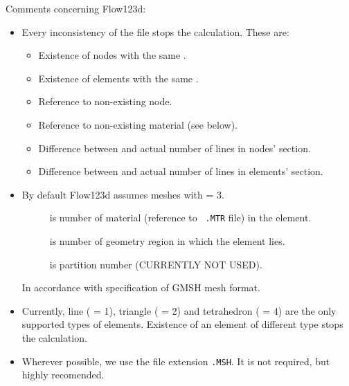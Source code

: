 Comments concerning Flow123d:
\begin{itemize}
  \item Every inconsistency of the file stops the calculation.
    These are:
      \begin{itemize}
        \item Existence of nodes with the same .
        \item Existence of elements with the same .
        \item Reference to non-existing node.
        \item Reference to non-existing material (see below).
        \item Difference between  and actual number of
          lines in nodes' section.
        \item Difference between  and actual number of
          lines in elements' section.
      \end{itemize}
  \item By default Flow123d assumes meshes with  = 3. 
    \begin{description}
    \item[] is number of material (reference to {\tt
    .MTR} file) in the element.
    \item[] is number of geometry region in which the element lies. 
    \item[] is partition number (CURRENTLY NOT USED).
    \end{description}
    In accordance with specification of GMSH mesh format.
  \item Currently, line ( = 1), triangle ( = 2) and
    tetrahedron ( = 4) are the only supported types
    of elements. Existence of an element of different type stops the calculation.
  \item Wherever possible, we use the file extension {\tt .MSH}. It is not
    required, but highly recomended.
\end{itemize}



